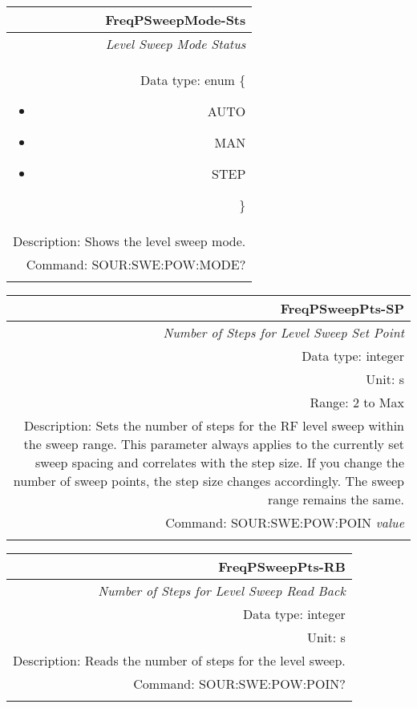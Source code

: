 \documentclass[openany]{article}
\begin{document}
		\begin{tabular}{N}
			\hline
			\bfseries FreqPSweepMode-Sts \\ \hline
			\emph{Level Sweep Mode Status} \\
			Data type: enum \{\begin{itemize}[noitemsep]
				\small
				\item[] AUTO
				\item[] MAN
				\item[] STEP
			\end{itemize}\} \\ 
			Description: Shows the level sweep mode. \\
			Command: SOUR:SWE:POW:MODE? \\
			\\

		\end{tabular}


		\begin{tabular}{N}
			\hline
			\bfseries FreqPSweepPts-SP \\ \hline
			\emph{Number of Steps for Level Sweep Set Point} \\
			Data type: integer \\
			Unit: s \\
			Range: 2 to Max \\ 
			Description: Sets the number of steps for the RF level sweep within the sweep range. This parameter always applies to the currently set sweep spacing and correlates with the step size. If you change the number of sweep points, the step size changes accordingly. The sweep range remains the same. \\
			Command: SOUR:SWE:POW:POIN \emph{value} \\
			\\
			
		\end{tabular}


		\begin{tabular}{N}
			\hline
			\bfseries FreqPSweepPts-RB \\ \hline
			\emph{Number of Steps for Level Sweep Read Back} \\
			Data type: integer \\
			Unit: s \\
			Description: Reads the number of steps for the level sweep. \\
			Command: SOUR:SWE:POW:POIN? \\
			\\

		\end{tabular}
\end{document}
